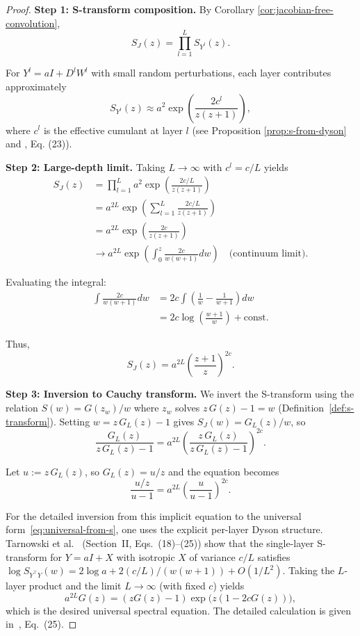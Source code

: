 \begin{proof}
\textbf{Step 1: S-transform composition.} By Corollary \ref{cor:jacobian-free-convolution},
\[
S_J(z) = \prod_{l=1}^L S_{Y^l}(z).
\]

For $Y^l = aI + D^l W^l$ with small random perturbations, each layer contributes approximately
\[
S_{Y^l}(z) \approx a^2 \exp\left(\frac{2c^l}{z(z+1)}\right),
\]
where $c^l$ is the effective cumulant at layer $l$ (see Proposition \ref{prop:s-from-dyson} and \cite{tarnowski2019dynamical}, Eq. (23)).

\textbf{Step 2: Large-depth limit.} Taking $L \to \infty$ with $c^l = c/L$ yields
\begin{align}
S_J(z) &= \prod_{l=1}^L a^2 \exp\left(\frac{2c/L}{z(z+1)}\right) \\
&= a^{2L} \exp\left(\sum_{l=1}^L \frac{2c/L}{z(z+1)}\right) \\
&= a^{2L} \exp\left(\frac{2c}{z(z+1)}\right) \\
&\to a^{2L} \exp\left(\int_0^z \frac{2c}{w(w+1)} dw\right) \quad \text{(continuum limit)}.
\end{align}

Evaluating the integral:
\begin{align}
\int \frac{2c}{w(w+1)} dw &= 2c \int \left(\frac{1}{w} - \frac{1}{w+1}\right) dw \\
&= 2c \log\left(\frac{w+1}{w}\right) + \text{const}.
\end{align}

Thus,
\[
S_J(z) = a^{2L} \left(\frac{z+1}{z}\right)^{2c}.
\]

\textbf{Step 3: Inversion to Cauchy transform.} We invert the S-transform using the relation $S(w) = G(z_w)/w$ where $z_w$ solves $z\,G(z) - 1 = w$ (Definition~\ref{def:s-transform}). Setting $w = z\,G_L(z) - 1$ gives $S_J(w) = G_L(z)/w$, so
\[
\frac{G_L(z)}{z\,G_L(z) - 1} = a^{2L} \left(\frac{z\,G_L(z)}{z\,G_L(z) - 1}\right)^{2c}.
\]

Let $u := z\,G_L(z)$, so $G_L(z) = u/z$ and the equation becomes
\[
\frac{u/z}{u - 1} = a^{2L} \left(\frac{u}{u - 1}\right)^{2c}.
\]

For the detailed inversion from this implicit equation to the universal form~\eqref{eq:universal-from-s}, one uses the explicit per-layer Dyson structure. Tarnowski et al.~\cite{tarnowski2019dynamical} (Section~II, Eqs.~(18)--(25)) show that the single-layer S-transform for $Y = aI + X$ with isotropic $X$ of variance $c/L$ satisfies $\log S_{Y^\top Y}(w) = 2\log a + 2(c/L)/(w(w+1)) + O(1/L^2)$. Taking the $L$-layer product and the limit $L \to \infty$ (with fixed $c$) yields
\[
a^{2L} G(z) = (zG(z) - 1) \exp\bigl(z(1 - 2cG(z))\bigr),
\]
which is the desired universal spectral equation. The detailed calculation is given in~\cite{tarnowski2019dynamical}, Eq.~(25).
\end{proof}

